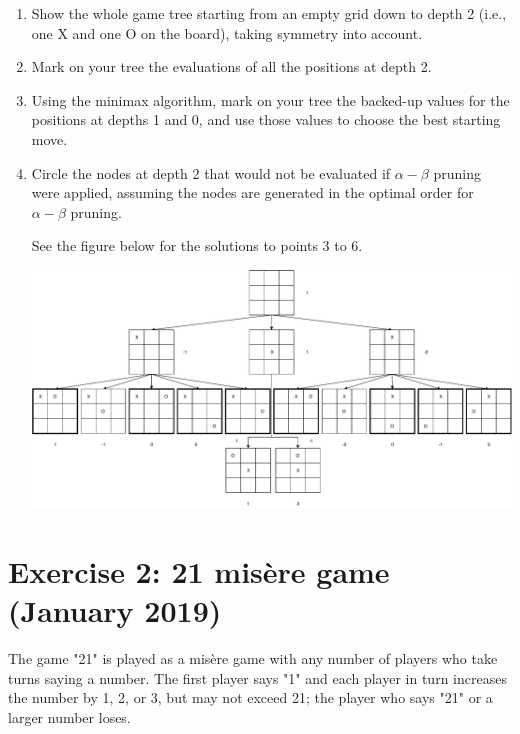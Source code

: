\documentclass[9pt,a4paper]{extarticle}
\newenvironment{solution}
    {%
    \color{red}
    }
    { 
    \color{black}
    }
\begin{document}
\begin{enumerate}
\begin{solution}
    \end{solution}
    \item Show the whole game tree starting from an empty grid down to depth 2 (i.e., one X
and one O on the board), taking symmetry into account.
    \item Mark on your tree the evaluations of all the positions at depth 2.
    \item Using the minimax algorithm, mark on your tree the backed-up values for the     positions at depths 1 and 0, and use those values to choose the best starting move.
    \item Circle the nodes at depth 2 that would not be evaluated if $\alpha-\beta$ pruning were
applied, assuming the nodes are generated in the optimal order for $\alpha-\beta$ pruning.
\begin{solution}
See the figure below for the solutions to points 3 to 6.
\begin{center}
 \includegraphics[width=.7\textwidth]{figures/tictactoe.pdf}   
\end{center}

\end{solution}
\end{enumerate}
\section*{Exercise 2: 21 misère game (January 2019)}
The game "21" is played as a misère game with any number of players who take turns saying a number. The first player says "1" and each player in turn increases the number by 1, 2, or 3, but may not exceed 21; the player who says "21" or a larger number   loses. 
\end{document}
